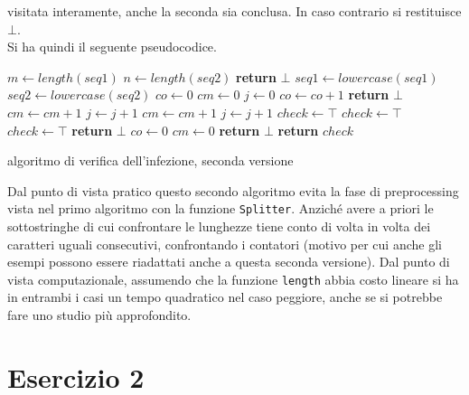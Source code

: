 \documentclass[a4paper,12pt, oneside]{book}
\begin{document}
visitata interamente, anche la seconda sia conclusa. In caso contrario si
restituisce $\bot$.\\
Si ha quindi il seguente pseudocodice.
\begin{algorithm}[H]
  \begin{algorithmic}[1]
    \State $m \gets length(seq1)$
    \State $n \gets length(seq2)$
    \State \textbf{return} $\bot$
    \EndIf
    \State $seq1\gets lowercase(seq1)$
    \State $seq2\gets lowercase(seq2)$
    \State $co \gets 0$
    \State $cm \gets 0$
    \State $j \gets 0$
    \State $co \gets co+1$
    \If {$i==n-1$ \textbf{or} $seq1[i]\neq seq[i+1$}
    \State \textbf{return} $\bot$
    \EndIf
    \State $cm \gets cm+1$
    \State $j \gets j+1$
    \EndWhile
    \State $cm \gets cm+1$
    \State $j \gets j+1$
    \State $check \gets \top$
    \State $check \gets \top$
    \State $check \gets \top$
    \Else
    \State  \textbf{return} $\bot$
    \EndIf
    \State $co \gets 0$
    \State $cm \gets 0$
    \State  \textbf{return} $\bot$
    \EndIf
    \EndIf
    \EndFor
    \State \textbf{return} $check$
    \EndFunction
  \end{algorithmic}
  \caption{algoritmo di verifica dell'infezione, seconda versione}
\end{algorithm}
Dal punto di vista pratico questo secondo algoritmo evita la fase di
preprocessing vista nel primo algoritmo con la funzione
\texttt{Splitter}. Anziché avere a priori le sottostringhe di cui confrontare le
lunghezze tiene conto di volta in volta dei caratteri uguali consecutivi,
confrontando i contatori (motivo per cui anche gli esempi possono essere
riadattati anche a questa seconda versione). Dal
punto di vista computazionale, assumendo che la funzione \texttt{length} abbia
costo lineare si ha in entrambi i casi un tempo quadratico nel caso peggiore,
anche se si potrebbe fare uno studio più approfondito. 
\chapter{Esercizio 2}
\end{document}

